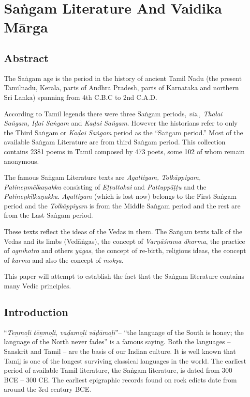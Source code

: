 
\chapter{Saṅgam Literature And Vaidika Mārga}\label{chapter6}



\section*{Abstract}

The Saṅgam age is the period in the history of ancient Tamil Nadu (the present Tamilnadu, Kerala, parts of Andhra Pradesh, parts of Karnataka and northern Sri Lanka) spanning from 4th C.B.C to 2nd C.A.D.

According to Tamil legends there were three Saṅgam periods, \textit{viz., Thalai Saṅgam, Iḍai Saṅgam} and \textit{Kaḍai Saṅgam}. However the historians refer to only the Third Saṅgam or \textit{Kaḍai Saṅgam} period as the “Saṅgam period.” Most of the available Saṅgam Literature are from third Saṅgam period. This collection contains 2381 poems in Tamil composed by 473 poets, some 102 of whom remain anonymous.

The famous Saṅgam Literature texts are \textit{Agattiyam, Tolkāppiyam, Patineṇmēlkaṇakku} consisting of \textit{Eṭṭuttokai} and \textit{Pattuppāṭṭu} and the \textit{Patineṇkīḻkaṇakku}. \textit{Agattiyam} (which is lost now) belongs to the First Saṅgam period and the \textit{Tolkāppiyam} is from the Middle Saṅgam period and the rest are from the Last Saṅgam period.

These texts reflect the ideas of the Vedas in them. The Saṅgam texts talk of the Vedas and its limbs (Vedāṅgas), the concept of \textit{Varṇāśrama dharma}, the practice of \textit{agnihotra} and others \textit{yāgas}, the concept of re-birth, religious ideas, the concept of \textit{karma} and also the concept of \textit{mokṣa}.

This paper will attempt to establish the fact that the Saṅgam literature contains many Vedic principles.


\section*{Introduction}

“\textit{Teṉmoḻi tēṉmoḻi, vaḍamoḻi vāḍāmoḻi}”– “the language of the South is honey; the language of the North never fades” is a famous saying. Both the languages – Sanskrit and Tamiḻ – are the basis of our Indian culture. It is well known that Tamiḻ is one of the longest surviving classical languages in the world. The earliest period of available Tamiḻ literature, the Saṅgam literature, is dated from 300 BCE – 300 CE. The earliest epigraphic records found on rock edicts date from around the 3rd century BCE.

